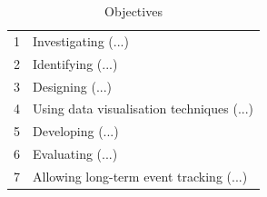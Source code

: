 \begin{table}[h]
  \begin{center}
    \begin{tabular}{ p{} p{} }
      \cellcolor[rgb]{0.94,0.96,0.98}1 & Investigating (...) \\
      \cellcolor[rgb]{0.86,0.90,0.96}2 & Identifying (...) \\ 
      \cellcolor[rgb]{0.78,0.84,0.94}3 & Designing (...) \\
      \cellcolor[rgb]{0.71,0.78,0.92}4 & Using data visualisation techniques (...) \\
      \cellcolor[rgb]{0.63,0.73,0.89}5 & Developing (...) \\
      \cellcolor[rgb]{0.55,0.67,0.87}6 & Evaluating (...) \\
      \cellcolor[rgb]{0.47,0.61,0.85}7 & Allowing long-term event tracking (...) \\
    \end{tabular}
    \caption{Objectives}
    \label{tab:objectives}
  \end{center}
\end{table}

